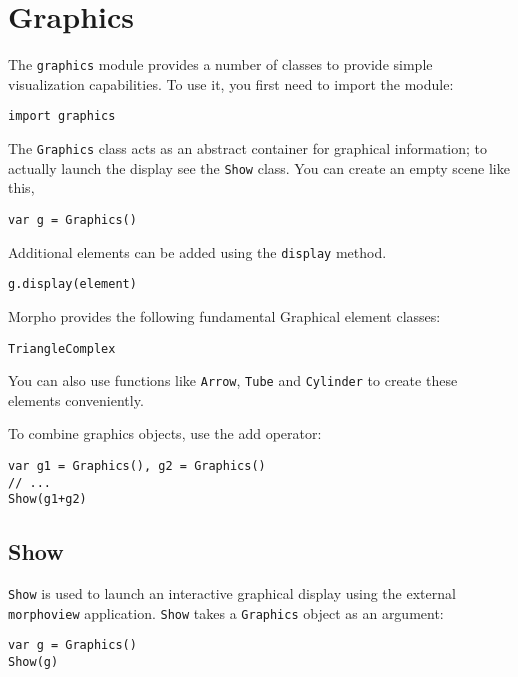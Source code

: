 \hypertarget{graphics}{%
\section{Graphics}\label{graphics}}

The \texttt{graphics} module provides a number of classes to provide
simple visualization capabilities. To use it, you first need to import
the module:

\begin{lstlisting}
import graphics
\end{lstlisting}

The \texttt{Graphics} class acts as an abstract container for graphical
information; to actually launch the display see the \texttt{Show} class.
You can create an empty scene like this,

\begin{lstlisting}
var g = Graphics()
\end{lstlisting}

Additional elements can be added using the \texttt{display} method.

\begin{lstlisting}
g.display(element)
\end{lstlisting}

Morpho provides the following fundamental Graphical element classes:

\begin{lstlisting}
TriangleComplex
\end{lstlisting}

You can also use functions like \texttt{Arrow}, \texttt{Tube} and
\texttt{Cylinder} to create these elements conveniently.

To combine graphics objects, use the add operator:

\begin{lstlisting}
var g1 = Graphics(), g2 = Graphics()
// ...
Show(g1+g2)
\end{lstlisting}

\hypertarget{show}{%
\subsection{Show}\label{show}}

\texttt{Show} is used to launch an interactive graphical display using
the external \texttt{morphoview} application. \texttt{Show} takes a
\texttt{Graphics} object as an argument:

\begin{lstlisting}
var g = Graphics()
Show(g)
\end{lstlisting}

